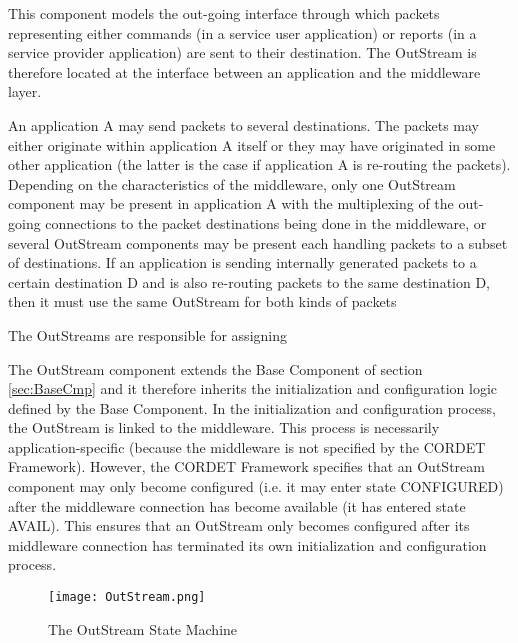 This component models the out-going interface through which packets representing either commands (in a service user application) or reports (in a service provider application) are sent to their destination. The OutStream is therefore located at the interface between an application and the middleware layer. 

An application A may send packets to several destinations. The packets may either originate within application A itself or they may have originated in some other application (the latter is the case if application A is re-routing the packets). Depending on the characteristics of the middleware, only one OutStream component may be present in application A with the multiplexing of the out-going connections to the packet destinations being done in the middleware, or several OutStream components may be present each handling packets to a subset of destinations. If an application is sending internally generated packets to a certain destination D and is also re-routing packets to the same destination D, then it must use the same OutStream for both kinds of packets 


The OutStreams are responsible for assigning 

The OutStream component extends the Base Component of section \ref{sec:BaseCmp} and it therefore inherits the initialization and configuration logic defined by the Base Component. In the initialization and configuration process, the OutStream is linked to the middleware. This process is necessarily application-specific (because the middleware is not specified by the CORDET Framework). However, the CORDET Framework specifies that an OutStream component may only become configured (i.e. it may enter state CONFIGURED) after the middleware connection has become available (it has entered state AVAIL). This ensures that an OutStream only becomes configured after its middleware connection has terminated its own initialization and configuration process.

\begin{figure}[ht]
 \centering
 \texttt{[image: OutStream.png]}
 \caption{The OutStream State Machine}
 \label{fig:OutStream}
\end{figure}

